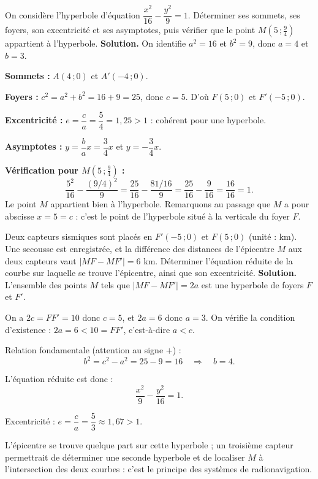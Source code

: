 \documentclass[11pt]{article}
\newcounter{popsec}
\newcounter{popsub}
\newcommand{\courssub}[1]{%
  \stepcounter{popsub}%
  \par\vspace{9pt}\noindent{\popxbold\fontsize{11.5}{13}\selectfont\color{popink}{\color{poporange}\thepopsec.\thepopsub}\hspace{6pt}#1}\par\nopagebreak\vspace{4pt}
}
\begin{document}
\courssub{Exercices résolus}

\begin{exoresolu}
On considère l'hyperbole d'équation $\dfrac{x^2}{16} - \dfrac{y^2}{9} = 1$. Déterminer ses sommets, ses foyers, son excentricité et ses asymptotes, puis vérifier que le point $M(5\,;\tfrac{9}{4})$ appartient à l'hyperbole.
\tcblower
\textbf{Solution.} On identifie $a^2 = 16$ et $b^2 = 9$, donc $a = 4$ et $b = 3$.

\textbf{Sommets :} $A(4\,;0)$ et $A'(-4\,;0)$.

\textbf{Foyers :} $c^2 = a^2 + b^2 = 16 + 9 = 25$, donc $c = 5$. D'où $F(5\,;0)$ et $F'(-5\,;0)$.

\textbf{Excentricité :} $e = \dfrac{c}{a} = \dfrac{5}{4} = 1{,}25 > 1$ : cohérent pour une hyperbole.

\textbf{Asymptotes :} $y = \dfrac{b}{a}x = \dfrac{3}{4}x$ et $y = -\dfrac{3}{4}x$.

\textbf{Vérification pour $M(5\,;\tfrac{9}{4})$ :}
\[ \frac{5^2}{16} - \frac{(9/4)^2}{9} = \frac{25}{16} - \frac{81/16}{9} = \frac{25}{16} - \frac{9}{16} = \frac{16}{16} = 1. \]
Le point $M$ appartient bien à l'hyperbole. Remarquons au passage que $M$ a pour abscisse $x = 5 = c$ : c'est le point de l'hyperbole situé à la verticale du foyer $F$.
\end{exoresolu}

\begin{exoresolu}
Deux capteurs sismiques sont placés en $F'(-5\,;0)$ et $F(5\,;0)$ (unité : km). Une secousse est enregistrée, et la différence des distances de l'épicentre $M$ aux deux capteurs vaut $|MF - MF'| = 6$ km. Déterminer l'équation réduite de la courbe sur laquelle se trouve l'épicentre, ainsi que son excentricité.
\tcblower
\textbf{Solution.} L'ensemble des points $M$ tels que $|MF - MF'| = 2a$ est une hyperbole de foyers $F$ et $F'$.

On a $2c = FF' = 10$ donc $c = 5$, et $2a = 6$ donc $a = 3$. On vérifie la condition d'existence : $2a = 6 < 10 = FF'$, c'est-à-dire $a < c$. 

Relation fondamentale (attention au signe $+$) :
\[ b^2 = c^2 - a^2 = 25 - 9 = 16 \quad \Rightarrow \quad b = 4. \]

L'équation réduite est donc :
\[ \frac{x^2}{9} - \frac{y^2}{16} = 1. \]

Excentricité : $e = \dfrac{c}{a} = \dfrac{5}{3} \approx 1{,}67 > 1$.

L'épicentre se trouve quelque part sur cette hyperbole ; un troisième capteur permettrait de déterminer une seconde hyperbole et de localiser $M$ à l'intersection des deux courbes : c'est le principe des systèmes de radionavigation.
\end{exoresolu}
\end{document}

